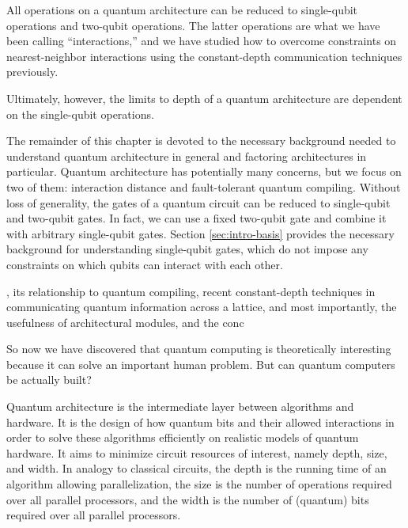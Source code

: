 All operations on a quantum architecture can be reduced to single-qubit operations and two-qubit operations.
The latter operations are what we have been calling ``interactions,'' and we have studied how to overcome
constraints on nearest-neighbor interactions using the constant-depth communication techniques previously.

Ultimately, however, the limits to depth of a quantum architecture are
dependent on the single-qubit operations. 

The remainder of this chapter is devoted to the necessary background needed
to understand quantum architecture in general and factoring architectures
in particular. Quantum architecture has potentially many concerns, but we
focus on two of them: interaction distance and fault-tolerant quantum compiling.
Without loss of generality, the gates of a quantum circuit can be reduced to
single-qubit and two-qubit gates. In fact, we can use a fixed two-qubit gate
and combine it with arbitrary single-qubit gates.
Section \ref{sec:intro-basis} provides the necessary background for
understanding single-qubit gates, which do not impose any constraints on
which qubits can interact with each other.

, its relationship to quantum compiling,
recent constant-depth techniques in communicating quantum information across
a lattice, and most importantly,
the usefulness of architectural modules,
and the conc









So now we have discovered that quantum computing is theoretically interesting because it can solve an important human problem. But can quantum computers be actually built?

Quantum architecture is the intermediate layer between algorithms and hardware.
It is the design of how quantum bits and their allowed interactions in order to solve these algorithms efficiently on realistic models of quantum hardware.
It aims to minimize circuit resources of interest, namely depth, size, and width. In analogy to classical circuits, the depth is the running time of an algorithm allowing parallelization, the size is the number of operations required over all parallel processors, and the width is the number of (quantum) bits required over all parallel processors.

